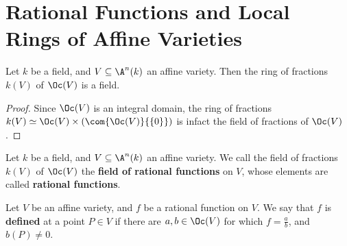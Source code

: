 \section{Rational Functions and Local Rings of Affine Varieties}
\label{section_2.3}

\begin{proposition}\label{proposition_2.3.1}
  Let $k$ be a field, and  $V \subseteq \A^n(k)$ an affine variety.
  Then the ring of fractions $k(V)$ of $\Oc(V)$ is a field.
\end{proposition}
\begin{proof}
  Since $\Oc(V)$ is an integral domain, the ring of fractions $k(V)
  \simeq \Oc(V) \times (\com{\Oc(V)}{\{0\}})$ is infact the field of
  fractions of $\Oc(V)$.
\end{proof}

\begin{definition}
  Let $k$ be a field, and  $V \subseteq \A^n(k)$ an affine variety. We
  call the field of fractions $k(V)$ of $\Oc(V)$ the \textbf{field of
  rational functions} on $V$, whose elements are called
  \textbf{rational functions}.
\end{definition}

\begin{definition}
  Let $V$ be an affine variety, and  $f$ be a rational function on
  $V$. We say that  $f$ is \textbf{defined} at a point $P \in V$ if
  there are $a, b \in \Oc(V)$ for which $f=\frac{a}{b}$, and $b(P)
  \neq 0$.
\end{definition}

